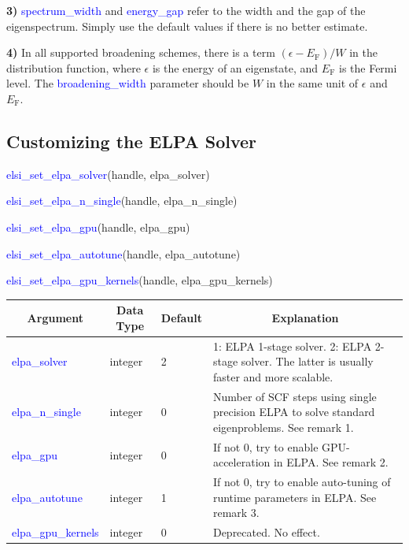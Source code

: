 \documentclass{report}
\begin{document}
\textbf{3)} \textcolor{blue}{spectrum\_width} and \textcolor{blue}{energy\_gap} refer to the width and the gap of the eigenspectrum. Simply use the default values if there is no better estimate.

\textbf{4)} In all supported broadening schemes, there is a term $(\epsilon - E_\text{F})/W$ in the distribution function, where $\epsilon$ is the energy of an eigenstate, and $E_\text{F}$ is the Fermi level. The \textcolor{blue}{broadening\_width} parameter should be $W$ in the same unit of $\epsilon$ and $E_\text{F}$.

\subsection{Customizing the ELPA Solver}
\label{subsec:setter_elpa}
\begin{labeling}{\hspace{6cm}}
\item [\hspace{0.3cm} \textcolor{blue}{elsi\_set\_elpa\_solver}(handle, elpa\_solver)]
\item [\hspace{0.3cm} \textcolor{blue}{elsi\_set\_elpa\_n\_single}(handle, elpa\_n\_single)]
\item [\hspace{0.3cm} \textcolor{blue}{elsi\_set\_elpa\_gpu}(handle, elpa\_gpu)]
\item [\hspace{0.3cm} \textcolor{blue}{elsi\_set\_elpa\_autotune}(handle, elpa\_autotune)]
\item [\hspace{0.3cm} \textcolor{blue}{elsi\_set\_elpa\_gpu\_kernels}(handle, elpa\_gpu\_kernels)]
\end{labeling}

\begin{tabular}[]{|p{30mm}|p{20mm}|p{15mm}|p{100mm}|}
\hline
\multicolumn{1}{|c|}{\textbf{Argument}} & \multicolumn{1}{c|}{\textbf{Data Type}} & \multicolumn{1}{c|}{\textbf{Default}} & \multicolumn{1}{c|}{\textbf{Explanation}}\\
\hline
\textcolor{blue}{elpa\_solver}       & integer & 2 & 1: ELPA 1-stage solver. 2: ELPA 2-stage solver. The latter is usually faster and more scalable.\\
\hline
\textcolor{blue}{elpa\_n\_single}    & integer & 0 & Number of SCF steps using single precision ELPA to solve standard eigenproblems. See remark 1.\\
\hline
\textcolor{blue}{elpa\_gpu}          & integer & 0 & If not 0, try to enable GPU-acceleration in ELPA. See remark 2.\\
\hline
\textcolor{blue}{elpa\_autotune}     & integer & 1 & If not 0, try to enable auto-tuning of runtime parameters in ELPA. See remark 3.\\
\hline
\textcolor{blue}{elpa\_gpu\_kernels} & integer & 0 & Deprecated. No effect.\\
\hline
\end{tabular}
\end{document}
